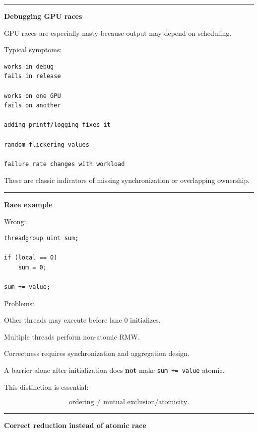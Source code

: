 \begin{center}\rule{0.5\linewidth}{0.5pt}\end{center}

\textbf{Debugging GPU races}

GPU races are especially nasty because output may depend on scheduling.

Typical symptoms:

\protect{}\label{p10-race-symptoms}%
\begin{verbatim}
works in debug
fails in release

works on one GPU
fails on another

adding printf/logging fixes it

random flickering values

failure rate changes with workload
\end{verbatim}

These are classic indicators of missing synchronization or overlapping ownership.

\begin{center}\rule{0.5\linewidth}{0.5pt}\end{center}

\textbf{Race example}

Wrong:

\protect{}\label{p10-race}%
\begin{verbatim}
threadgroup uint sum;

if (local == 0)
    sum = 0;

sum += value;
\end{verbatim}

Problems:

Other threads may execute before lane 0 initializes.

Multiple threads perform non-atomic RMW.

Correctness requires synchronization and aggregation design.

A barrier alone after initialization does \textbf{not} make \texttt{sum\ +=\ value} atomic.

This distinction is essential:

\[
\boxed{
\text{ordering}
\neq
\text{mutual exclusion/atomicity}.
}
\]

\begin{center}\rule{0.5\linewidth}{0.5pt}\end{center}

\textbf{Correct reduction instead of atomic race}

